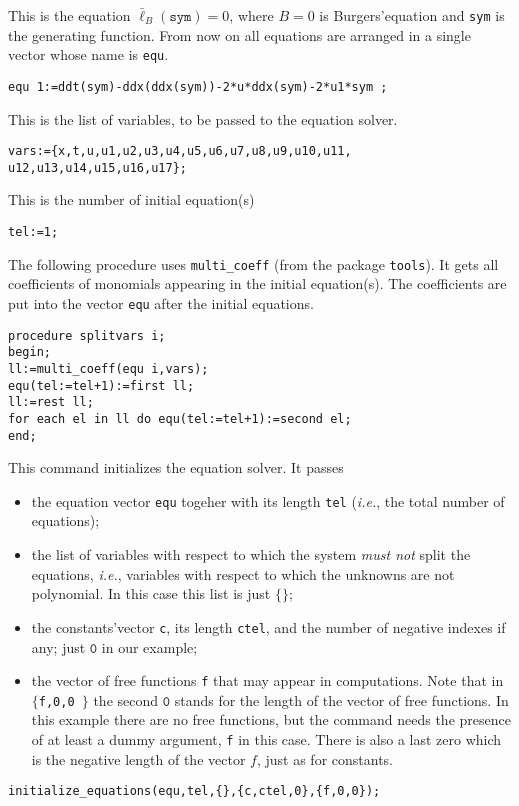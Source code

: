 This is the equation $\bar\ell_B(\mathtt{sym})=0$, where $B=0$ is
Burgers'equation and \texttt{sym} is the generating function. From now on all
equations are arranged in a single vector whose name is \texttt{equ}.
\begin{verbatim}
equ 1:=ddt(sym)-ddx(ddx(sym))-2*u*ddx(sym)-2*u1*sym ;
\end{verbatim}

This is the list of variables, to be passed to the equation solver.
\begin{verbatim}
vars:={x,t,u,u1,u2,u3,u4,u5,u6,u7,u8,u9,u10,u11,
u12,u13,u14,u15,u16,u17};
\end{verbatim}

This is the number of initial equation(s)
\begin{verbatim}
tel:=1;
\end{verbatim}

The following procedure uses \texttt{multi\_coeff} (from the package
\texttt{tools}).  It gets all coefficients of monomials appearing in the
initial equation(s).  The coefficients are put into the vector \texttt{equ}
after the initial equations.
\begin{verbatim}
procedure splitvars i;
begin;
ll:=multi_coeff(equ i,vars);
equ(tel:=tel+1):=first ll;
ll:=rest ll;
for each el in ll do equ(tel:=tel+1):=second el;
end;
\end{verbatim}

This command initializes the equation solver.  It passes
\begin{itemize}
  \item the equation vector \texttt{equ} togeher with its length \texttt{tel}
    (\emph{i.e.}, the total number of equations);
  \item the list of variables with respect to which the system \emph{must not}
    split the equations, \emph{i.e.}, variables with respect to which the
    unknowns are not polynomial. In this case this list is just $\{\}$;
  \item the constants'vector \texttt{c}, its length \texttt{ctel}, and the
    number of negative indexes if any; just $\texttt{0}$ in our example;
  \item the vector of free functions \texttt{f} that may appear in
    computations. Note that in \texttt{$\{$f,0,0 $\}$} the second $\texttt{0}$
    stands for the length of the vector of free functions. In this example
    there are no free functions, but the command needs the presence of at least
    a dummy argument, \texttt{f} in this case. There is also a last zero which
    is the negative length of the vector $f$, just as for constants.
  \end{itemize}
\begin{verbatim}
initialize_equations(equ,tel,{},{c,ctel,0},{f,0,0});
\end{verbatim}

